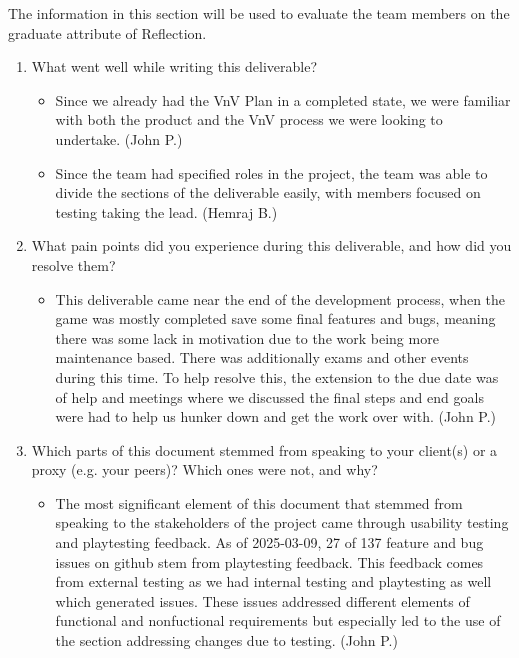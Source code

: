 \documentclass[12pt, titlepage]{article}
\begin{document}
The information in this section will be used to evaluate the team members on the
graduate attribute of Reflection.



\begin{enumerate}
  \item What went well while writing this deliverable?
  
\begin{itemize}
  \item Since we already had the VnV Plan in a completed state, we were familiar with both the product and the VnV process we were looking to undertake. (John P.)
  \item  Since the team had specified roles in the project, the team was able to divide the sections of the deliverable easily, with members focused on testing taking the lead. (Hemraj B.)
\end{itemize}  
  
  \item What pain points did you experience during this deliverable, and how
    did you resolve them?
    
\begin{itemize}
  \item This deliverable came near the end of the development process, when the game was mostly completed save some final features and bugs, meaning there was some lack in motivation due to the work being more maintenance based. There was additionally exams and other events during this time. To help resolve this, the extension to the due date was of help and meetings where we discussed the final steps and end goals were had to help us hunker down and get the work over with. (John P.)
\end{itemize}    
    
  \item Which parts of this document stemmed from speaking to your client(s) or
  a proxy (e.g. your peers)? Which ones were not, and why?

\begin{itemize}
  \item The most significant element of this document that stemmed from speaking to the stakeholders of the project came through usability testing and playtesting feedback. As of 2025-03-09, 27 of 137 feature and bug issues on github stem from playtesting feedback. This feedback comes from external testing as we had internal testing and playtesting as well which generated issues. These issues addressed different elements of functional and nonfuctional requirements but especially led to the use of the section addressing changes due to testing. (John P.)
\end{itemize}
  

\end{enumerate}
\end{document}
